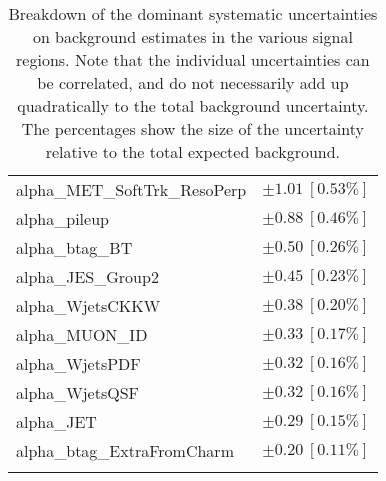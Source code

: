 \begin{table}
\begin{center}
\begin{tabular*}{\textwidth}{@{\extracolsep{\fill}}lc}
alpha\_MET\_SoftTrk\_ResoPerp         & $\pm 1.01\ [0.53\%] $       \\
alpha\_pileup         & $\pm 0.88\ [0.46\%] $       \\
alpha\_btag\_BT         & $\pm 0.50\ [0.26\%] $       \\
alpha\_JES\_Group2         & $\pm 0.45\ [0.23\%] $       \\
alpha\_WjetsCKKW         & $\pm 0.38\ [0.20\%] $       \\
alpha\_MUON\_ID         & $\pm 0.33\ [0.17\%] $       \\
alpha\_WjetsPDF         & $\pm 0.32\ [0.16\%] $       \\
alpha\_WjetsQSF         & $\pm 0.32\ [0.16\%] $       \\
alpha\_JET         & $\pm 0.29\ [0.15\%] $       \\
alpha\_btag\_ExtraFromCharm         & $\pm 0.20\ [0.11\%] $       \\
\noalign{\smallskip}\hline\noalign{\smallskip}
\end{tabular*}
\end{center}
\caption[Breakdown of uncertainty on background estimates]{
Breakdown of the dominant systematic uncertainties on background estimates in the various signal regions.
Note that the individual uncertainties can be correlated, and do not necessarily add up quadratically to 
the total background uncertainty. The percentages show the size of the uncertainty relative to the total expected background.
\label{table.results.bkgestimate.uncertainties.TRLMEM_cuts}}
\end{table}
%